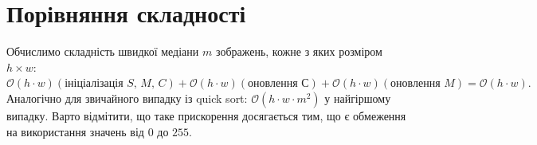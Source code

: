 \section{Порівняння складності}
Обчислимо складність швидкої медіани $m$ зображень, кожне з яких розміром $h \times w$:
$
    \mathcal{O}(h \cdot w) (\textit{ініціалізація S, M, C} )
    + \mathcal{O}(h \cdot w) (\textit{оновлення С})
    + \mathcal{O}(h \cdot w) (\textit{оновлення M}) = \mathcal{O}(h \cdot w).
$
Аналогічно для звичайного випадку із quick sort: $\mathcal{O}(h \cdot w \cdot m^2)$ у найгіршому випадку.
Варто відмітити, що таке прискорення досягається тим,
що є обмеження на використання значень від $0$ до $255$.

\clearpage
